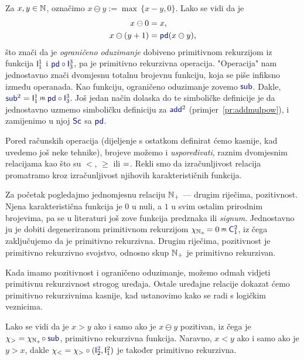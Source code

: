 \begin{primjer}\label{pr:sub}
Za $x,y\in{\mathbb N}$, označimo $x\ominus y:=\max\,\{x-y,0\}$. Lako se vidi da je
\begin{align}
    x\ominus0&=x\text,\\
    x\ominus(y+1)&=\f{pd}(x\ominus y)\text,
\end{align}
što znači da je \emph{ograničeno oduzimanje} dobiveno primitivnom rekurzijom iz funkcija $\f I_1^1$ i $\f{pd}\circ\f I_3^3$, pa je primitivno rekurzivna operacija. "Operacija" nam jednostavno znači dvomjesnu totalnu brojevnu funkciju, koja se piše infiksno između operanada. Kao funkciju, ograničeno oduzimanje zovemo $\f{sub}$. Dakle, $\f{sub}^2=\f I_1^1\pr\f{pd}\circ\f I_3^3$. Još jedan način dolaska do te simboličke definicije je da jednostavno uzmemo simboličku definiciju za $\f{add}^2$ (primjer~\ref{pr:addmulpow}), i zamijenimo u njoj $\f{Sc}$ sa $\f{pd}$.
\end{primjer}

Pored računskih operacija (dijeljenje s ostatkom definirat ćemo kasnije, kad uvedemo još neke tehnike), brojeve možemo i \emph{uspoređivati}, raznim dvomjesnim relacijama  kao što su $<$, $\ge$ ili $=$. Rekli smo da izračunljivost relacija promatramo kroz izračunljivost njihovih karakterističnih funkcija.

\begin{primjer}\label{pr:N+prn}
Za početak pogledajmo jednomjesnu relaciju ${\mathbb N}_+$ --- drugim riječima, pozitivnost. Njena karakteristična funkcija je $0$ u nuli, a $1$ u svim ostalim prirodnim brojevima, pa se u literaturi još zove funkcija predznaka ili \emph{signum}. Jednostavno ju je dobiti degeneriranom primitivnom rekurzijom $\chi_{\N_+}\!=0\pr\f C_1^2$, iz čega zaključujemo da je primitivno rekurzivna. Drugim riječima, pozitivnost je primitivno rekurzivno svojstvo, odnosno skup ${\mathbb N}_+$ je primitivno rekurzivan.
\end{primjer}

Kada imamo pozitivnost i ograničeno oduzimanje, možemo odmah vidjeti primitivnu rekurzivnost strogog uređaja. Ostale uređajne relacije dokazat ćemo primitivno rekurzivnima kasnije, kad ustanovimo kako se radi s logičkim veznicima.

\begin{primjer}\label{pr:m-v}
Lako se vidi da je $x>y$ ako i samo ako je $x\ominus y$ pozitivan, iz čega je $\chi_>=\chi_{\N_+}\!\circ\f{sub}$, pri\-mi\-tiv\-no rekurzivna funkcija. Naravno, $x<y$ ako i samo ako je $y>x$, dakle $\chi_<=\chi_>\circ(\f I_2^2,\f I_1^2)$ je također primitivno rekurzivna.
\end{primjer}

